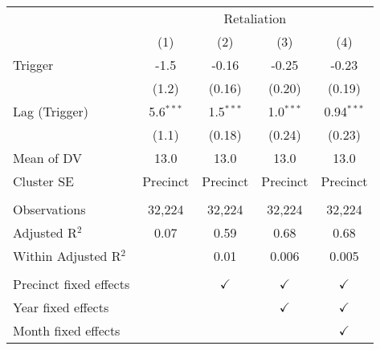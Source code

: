 \begingroup \centering \begin{tabular}{lcccc}    \toprule     & \multicolumn{4}{c}{Retaliation}\\                           & (1)         & (2)           & (3)           & (4)\\      \midrule     Trigger                & -1.5        & -0.16         & -0.25         & -0.23\\                              & (1.2)       & (0.16)        & (0.20)        & (0.19)\\       Lag (Trigger)          & 5.6$^{***}$ & 1.5$^{***}$   & 1.0$^{***}$   & 0.94$^{***}$\\                              & (1.1)       & (0.18)        & (0.24)        & (0.23)\\       Mean of DV             & 13.0        & 13.0          & 13.0          & 13.0\\      Cluster SE             & Precinct    & Precinct      & Precinct      & Precinct\\       \\    Observations           & 32,224      & 32,224        & 32,224        & 32,224\\      Adjusted R$^2$         & 0.07        & 0.59          & 0.68          & 0.68\\      Within Adjusted R$^2$  &             & 0.01          & 0.006         & 0.005\\       \\    Precinct fixed effects &             & $\checkmark$  & $\checkmark$  & $\checkmark$\\       Year fixed effects     &             &               & $\checkmark$  & $\checkmark$\\       Month fixed effects    &             &               &               & $\checkmark$\\       \bottomrule \end{tabular} \par\endgroup